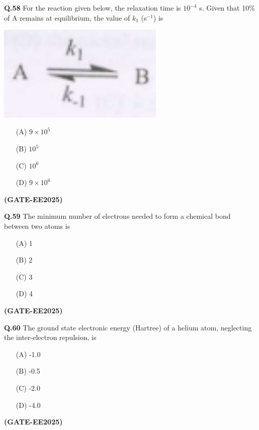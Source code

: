 \documentclass[12pt]{article}
\begin{document}
\begin{enumerate}
\textbf{Q.58} For the reaction given below, the relaxation time is $10^{-4}$ s. Given that 10\% of A remains at equilibrium, the value of $k_1$ (s$^{-1}$) is

\begin{center}
\includegraphics[width=0.6\textwidth]{figs/q58.png}
\end{center}

\begin{enumerate}
\item[(A)] $9 \times 10^5$
\item[(B)] $10^5$
\item[(C)] $10^6$
\item[(D)] $9 \times 10^6$
\end{enumerate}   \textbf{(GATE-EE2025)}


\vspace{0.5cm}

\textbf{Q.59} The minimum number of electrons needed to form a chemical bond between two atoms is

\begin{enumerate}
\item[(A)] 1
\item[(B)] 2
\item[(C)] 3
\item[(D)] 4
\end{enumerate}   \textbf{(GATE-EE2025)}


\vspace{0.5cm}

\textbf{Q.60} The ground state electronic energy (Hartree) of a helium atom, neglecting the inter-electron repulsion, is

\begin{enumerate}
\item[(A)] -1.0
\item[(B)] -0.5
\item[(C)] -2.0
\item[(D)] -4.0
\end{enumerate}   \textbf{(GATE-EE2025)}


\vspace{0.5cm}


\end{enumerate}
\end{document}
